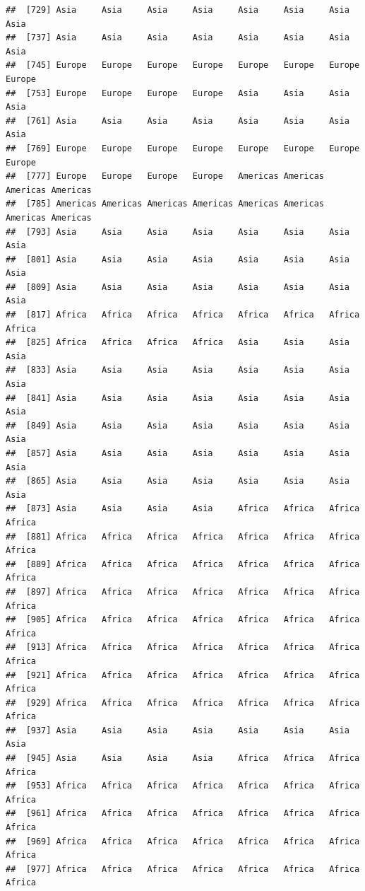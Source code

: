 \documentclass[
]{article}
\begin{document}
\begin{verbatim}
##  [729] Asia     Asia     Asia     Asia     Asia     Asia     Asia     Asia    
##  [737] Asia     Asia     Asia     Asia     Asia     Asia     Asia     Asia    
##  [745] Europe   Europe   Europe   Europe   Europe   Europe   Europe   Europe  
##  [753] Europe   Europe   Europe   Europe   Asia     Asia     Asia     Asia    
##  [761] Asia     Asia     Asia     Asia     Asia     Asia     Asia     Asia    
##  [769] Europe   Europe   Europe   Europe   Europe   Europe   Europe   Europe  
##  [777] Europe   Europe   Europe   Europe   Americas Americas Americas Americas
##  [785] Americas Americas Americas Americas Americas Americas Americas Americas
##  [793] Asia     Asia     Asia     Asia     Asia     Asia     Asia     Asia    
##  [801] Asia     Asia     Asia     Asia     Asia     Asia     Asia     Asia    
##  [809] Asia     Asia     Asia     Asia     Asia     Asia     Asia     Asia    
##  [817] Africa   Africa   Africa   Africa   Africa   Africa   Africa   Africa  
##  [825] Africa   Africa   Africa   Africa   Asia     Asia     Asia     Asia    
##  [833] Asia     Asia     Asia     Asia     Asia     Asia     Asia     Asia    
##  [841] Asia     Asia     Asia     Asia     Asia     Asia     Asia     Asia    
##  [849] Asia     Asia     Asia     Asia     Asia     Asia     Asia     Asia    
##  [857] Asia     Asia     Asia     Asia     Asia     Asia     Asia     Asia    
##  [865] Asia     Asia     Asia     Asia     Asia     Asia     Asia     Asia    
##  [873] Asia     Asia     Asia     Asia     Africa   Africa   Africa   Africa  
##  [881] Africa   Africa   Africa   Africa   Africa   Africa   Africa   Africa  
##  [889] Africa   Africa   Africa   Africa   Africa   Africa   Africa   Africa  
##  [897] Africa   Africa   Africa   Africa   Africa   Africa   Africa   Africa  
##  [905] Africa   Africa   Africa   Africa   Africa   Africa   Africa   Africa  
##  [913] Africa   Africa   Africa   Africa   Africa   Africa   Africa   Africa  
##  [921] Africa   Africa   Africa   Africa   Africa   Africa   Africa   Africa  
##  [929] Africa   Africa   Africa   Africa   Africa   Africa   Africa   Africa  
##  [937] Asia     Asia     Asia     Asia     Asia     Asia     Asia     Asia    
##  [945] Asia     Asia     Asia     Asia     Africa   Africa   Africa   Africa  
##  [953] Africa   Africa   Africa   Africa   Africa   Africa   Africa   Africa  
##  [961] Africa   Africa   Africa   Africa   Africa   Africa   Africa   Africa  
##  [969] Africa   Africa   Africa   Africa   Africa   Africa   Africa   Africa  
##  [977] Africa   Africa   Africa   Africa   Africa   Africa   Africa   Africa  

\end{verbatim}
\end{document}
